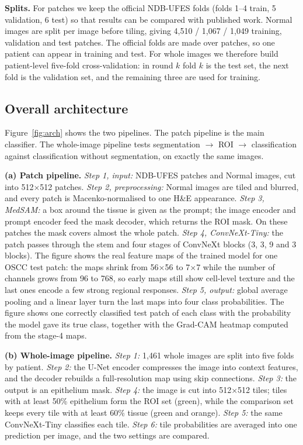 \documentclass[10pt,twocolumn]{article}
\begin{document}
\textbf{Splits.} For patches we keep the official NDB-UFES folds (folds 1--4 train, 5 validation, 6 test) so that results can be compared with published work. Normal images are split per image before tiling, giving 4,510 / 1,067 / 1,049 training, validation and test patches. The official folds are made over patches, so one patient can appear in training and test. For whole images we therefore build patient-level five-fold cross-validation: in round $k$ fold $k$ is the test set, the next fold is the validation set, and the remaining three are used for training.

\subsection{Overall architecture}

Figure~\ref{fig:arch} shows the two pipelines. The patch pipeline is the main classifier. The whole-image pipeline tests segmentation $\rightarrow$ ROI $\rightarrow$ classification against classification without segmentation, on exactly the same images.

\textbf{(a) Patch pipeline.} \emph{Step 1, input:} NDB-UFES patches and Normal images, cut into 512$\times$512 patches. \emph{Step 2, preprocessing:} Normal images are tiled and blurred, and every patch is Macenko-normalised to one H\&E appearance. \emph{Step 3, MedSAM:} a box around the tissue is given as the prompt; the image encoder and prompt encoder feed the mask decoder, which returns the ROI mask. On these patches the mask covers almost the whole patch. \emph{Step 4, ConvNeXt-Tiny:} the patch passes through the stem and four stages of ConvNeXt blocks (3, 3, 9 and 3 blocks). The figure shows the real feature maps of the trained model for one OSCC test patch: the maps shrink from 56$\times$56 to 7$\times$7 while the number of channels grows from 96 to 768, so early maps still show cell-level texture and the last ones encode a few strong regional responses. \emph{Step 5, output:} global average pooling and a linear layer turn the last maps into four class probabilities. The figure shows one correctly classified test patch of each class with the probability the model gave its true class, together with the Grad-CAM heatmap computed from the stage-4 maps.

\textbf{(b) Whole-image pipeline.} \emph{Step 1:} 1,461 whole images are split into five folds by patient. \emph{Step 2:} the U-Net encoder compresses the image into context features, and the decoder rebuilds a full-resolution map using skip connections. \emph{Step 3:} the output is an epithelium mask. \emph{Step 4:} the image is cut into 512$\times$512 tiles; tiles with at least 50\% epithelium form the ROI set (green), while the comparison set keeps every tile with at least 60\% tissue (green and orange). \emph{Step 5:} the same ConvNeXt-Tiny classifies each tile. \emph{Step 6:} tile probabilities are averaged into one prediction per image, and the two settings are compared.
\end{document}

